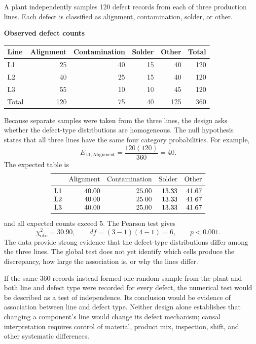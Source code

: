 \begin{example}\par
A plant independently samples 120 defect records from each of three production lines. Each defect is classified as alignment, contamination, solder, or other.

\begin{center}
\textbf{Observed defect counts}\par\medskip
\begin{tabular}{lrrrrr}
\toprule
Line & Alignment & Contamination & Solder & Other & Total \\
\midrule
L1 & 25 & 40 & 15 & 40 & 120 \\
L2 & 40 & 25 & 15 & 40 & 120 \\
L3 & 55 & 10 & 10 & 45 & 120 \\
\midrule
Total & 120 & 75 & 40 & 125 & 360 \\
\bottomrule
\end{tabular}
\end{center}

Because separate samples were taken from the three lines, the design asks whether the defect-type distributions are homogeneous. The null hypothesis states that all three lines have the same four category probabilities. For example,
\[
E_{\mathrm{L1,Alignment}}
=\frac{120(120)}{360}
=40.
\]
The expected table is
\[
\begin{array}{lrrrr}
\toprule
 & \text{Alignment} & \text{Contamination} & \text{Solder} & \text{Other}\\
\midrule
\text{L1} & 40.00 & 25.00 & 13.33 & 41.67\\
\text{L2} & 40.00 & 25.00 & 13.33 & 41.67\\
\text{L3} & 40.00 & 25.00 & 13.33 & 41.67\\
\bottomrule
\end{array}
\]
and all expected counts exceed 5. The Pearson test gives
\[
\chi^2_{\mathrm{obs}}=30.90,
\qquad
df=(3-1)(4-1)=6,
\qquad
p<0.001.
\]
The data provide strong evidence that the defect-type distributions differ among the three lines. The global test does not yet identify which cells produce the discrepancy, how large the association is, or why the lines differ.
\end{example}

If the same 360 records instead formed one random sample from the plant and both line and defect type were recorded for every defect, the numerical test would be described as a test of independence. Its conclusion would be evidence of association between line and defect type. Neither design alone establishes that changing a component's line would change its defect mechanism; causal interpretation requires control of material, product mix, inspection, shift, and other systematic differences.

